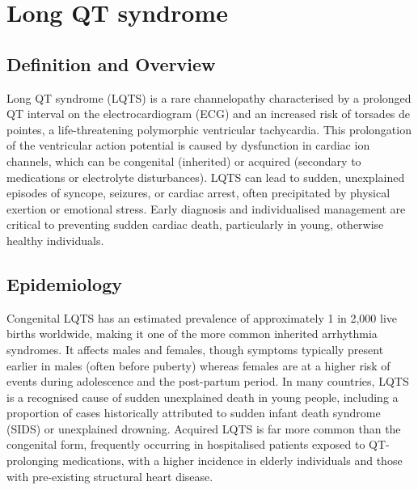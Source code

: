 \chapter{Long QT syndrome}

\section*{Definition and Overview}
Long QT syndrome (LQTS) is a rare channelopathy characterised by a prolonged QT interval on the electrocardiogram (ECG) and an increased risk of torsades de pointes, a life-threatening polymorphic ventricular tachycardia. This prolongation of the ventricular action potential is caused by dysfunction in cardiac ion channels, which can be congenital (inherited) or acquired (secondary to medications or electrolyte disturbances). LQTS can lead to sudden, unexplained episodes of syncope, seizures, or cardiac arrest, often precipitated by physical exertion or emotional stress. Early diagnosis and individualised management are critical to preventing sudden cardiac death, particularly in young, otherwise healthy individuals.

\section*{Epidemiology}
Congenital LQTS has an estimated prevalence of approximately 1 in 2,000 live births worldwide, making it one of the more common inherited arrhythmia syndromes. It affects males and females, though symptoms typically present earlier in males (often before puberty) whereas females are at a higher risk of events during adolescence and the post-partum period. In many countries, LQTS is a recognised cause of sudden unexplained death in young people, including a proportion of cases historically attributed to sudden infant death syndrome (SIDS) or unexplained drowning. Acquired LQTS is far more common than the congenital form, frequently occurring in hospitalised patients exposed to QT-prolonging medications, with a higher incidence in elderly individuals and those with pre-existing structural heart disease.

